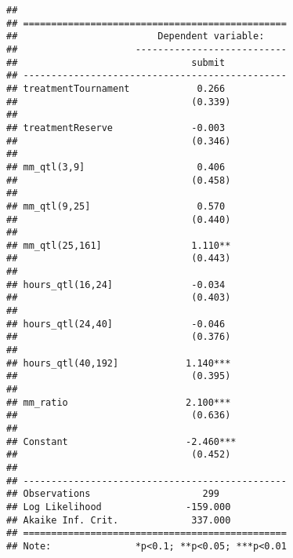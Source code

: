 \documentclass[11pt, titlepage]{article}
\begin{document}
\begin{verbatim}
## 
## ===============================================
##                         Dependent variable:    
##                     ---------------------------
##                               submit           
## -----------------------------------------------
## treatmentTournament            0.266           
##                               (0.339)          
##                                                
## treatmentReserve              -0.003           
##                               (0.346)          
##                                                
## mm_qtl(3,9]                    0.406           
##                               (0.458)          
##                                                
## mm_qtl(9,25]                   0.570           
##                               (0.440)          
##                                                
## mm_qtl(25,161]                1.110**          
##                               (0.443)          
##                                                
## hours_qtl(16,24]              -0.034           
##                               (0.403)          
##                                                
## hours_qtl(24,40]              -0.046           
##                               (0.376)          
##                                                
## hours_qtl(40,192]            1.140***          
##                               (0.395)          
##                                                
## mm_ratio                     2.100***          
##                               (0.636)          
##                                                
## Constant                     -2.460***         
##                               (0.452)          
##                                                
## -----------------------------------------------
## Observations                    299            
## Log Likelihood               -159.000          
## Akaike Inf. Crit.             337.000          
## ===============================================
## Note:               *p<0.1; **p<0.05; ***p<0.01
\end{verbatim}
\end{document}
